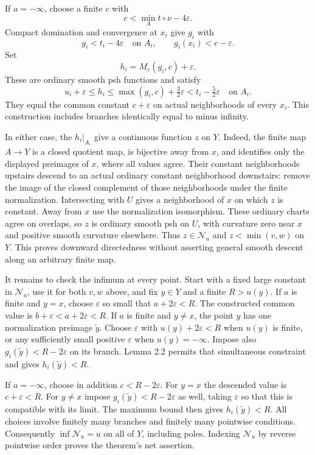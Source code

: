 \documentclass[
  11pt,
]{article}
\begin{document}
If \(a=-\infty\), choose a finite \(c\) with \[
c<\min_A t\circ\nu-4\varepsilon.
\] Compact domination and convergence at \(x_i\) give \(g_i\) with \[
g_i<t_i-4\varepsilon\quad\text{on }A_i,
\qquad g_i(x_i)<c-\varepsilon.
\] Set \[
h_i=M_\varepsilon(g_i,c)+\varepsilon.
\] These are ordinary smooth psh functions and satisfy \[
u_i+\varepsilon\leq h_i
\leq\max(g_i,c)+\tfrac32\varepsilon
<t_i-\tfrac52\varepsilon
\quad\text{on }A_i.
\] They equal the common constant \(c+\varepsilon\) on actual
neighborhoods of every \(x_i\). This construction includes branches
identically equal to minus infinity.

In either case, the \(h_i|_{A_i}\) give a continuous function \(z\) on
\(Y\). Indeed, the finite map \(A\to Y\) is a closed quotient map, is
bijective away from \(x\), and identifies only the displayed preimages
of \(x\), where all values agree. Their constant neighborhoods upstairs
descend to an actual ordinary constant neighborhood downstairs: remove
the image of the closed complement of those neighborhoods under the
finite normalization. Intersecting with \(U\) gives a neighborhood of
\(x\) on which \(z\) is constant. Away from \(x\) use the normalization
isomorphism. These ordinary charts agree on overlaps, so \(z\) is
ordinary smooth psh on \(U\), with curvature zero near \(x\) and
positive smooth curvature elsewhere. Thus \(z\in\mathcal N_u\) and
\(z<\min(v,w)\) on \(Y\). This proves downward directedness without
asserting general smooth descent along an arbitrary finite map.

It remains to check the infimum at every point. Start with a fixed large
constant in \(\mathcal N_u\), use it for both \(v,w\) above, and fix
\(y\in Y\) and a finite \(R>u(y)\). If \(a\) is finite and \(y=x\),
choose \(\varepsilon\) so small that \(a+2\varepsilon<R\). The
constructed common value is \(b+\varepsilon<a+2\varepsilon<R\). If \(a\)
is finite and \(y\ne x\), the point \(y\) has one normalization preimage
\(\widetilde y\). Choose \(\varepsilon\) with \(u(y)+2\varepsilon<R\)
when \(u(y)\) is finite, or any sufficiently small positive
\(\varepsilon\) when \(u(y)=-\infty\). Impose also
\(g_i(\widetilde y)<R-2\varepsilon\) on its branch. Lemma 2.2 permits
that simultaneous constraint and gives \(h_i(\widetilde y)<R\).

If \(a=-\infty\), choose in addition \(c<R-2\varepsilon\). For \(y=x\)
the descended value is \(c+\varepsilon<R\). For \(y\ne x\) impose
\(g_i(\widetilde y)<R-2\varepsilon\) as well, taking \(\varepsilon\) so
that this is compatible with its limit. The maximum bound then gives
\(h_i(\widetilde y)<R\). All choices involve finitely many branches and
finitely many pointwise conditions. Consequently \(\inf\mathcal N_u=u\)
on all of \(Y\), including poles. Indexing \(\mathcal N_u\) by reverse
pointwise order proves the theorem's net assertion.
\end{document}

